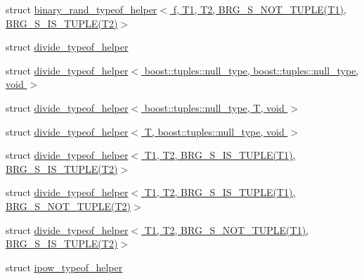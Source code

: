 \begin{DoxyCompactItemize}
struct \hyperlink{structIceBRG_1_1tuples_1_1binary__rand__typeof__helper_3_01f_00_01T1_00_01T2_00_01BRG__S__NOT__Taf66ad01f9236805ac3540fbfcbdbe8d}{binary\+\_\+rand\+\_\+typeof\+\_\+helper$<$ f, T1, T2, B\+R\+G\+\_\+\+S\+\_\+\+N\+O\+T\+\_\+\+T\+U\+P\+L\+E(\+T1), B\+R\+G\+\_\+\+S\+\_\+\+I\+S\+\_\+\+T\+U\+P\+L\+E(\+T2)$>$}
\item 
struct \hyperlink{namespaceIceBRG_1_1tuples_structIceBRG_1_1tuples_1_1divide__typeof__helper}{divide\+\_\+typeof\+\_\+helper}
\item 
struct \hyperlink{namespaceIceBRG_1_1tuples_structIceBRG_1_1tuples_1_1divide__typeof__helper_3_01boost_1_1tuples_1_1null__type_00_01boost_1_bd03af67120e73dd34936ad50f2c1b33}{divide\+\_\+typeof\+\_\+helper$<$ boost\+::tuples\+::null\+\_\+type, boost\+::tuples\+::null\+\_\+type, void $>$}
\item 
struct \hyperlink{namespaceIceBRG_1_1tuples_structIceBRG_1_1tuples_1_1divide__typeof__helper_3_01boost_1_1tuples_1_1null__type_00_01T_00_01void_01_4}{divide\+\_\+typeof\+\_\+helper$<$ boost\+::tuples\+::null\+\_\+type, T, void $>$}
\item 
struct \hyperlink{namespaceIceBRG_1_1tuples_structIceBRG_1_1tuples_1_1divide__typeof__helper_3_01T_00_01boost_1_1tuples_1_1null__type_00_01void_01_4}{divide\+\_\+typeof\+\_\+helper$<$ T, boost\+::tuples\+::null\+\_\+type, void $>$}
\item 
struct \hyperlink{namespaceIceBRG_1_1tuples_structIceBRG_1_1tuples_1_1divide__typeof__helper_3_01T1_00_01T2_00_01BRG__S__IS__TUPLE_07T1_08_00_01BRG__S__IS__TUPLE_07T2_08_4}{divide\+\_\+typeof\+\_\+helper$<$ T1, T2, B\+R\+G\+\_\+\+S\+\_\+\+I\+S\+\_\+\+T\+U\+P\+L\+E(\+T1), B\+R\+G\+\_\+\+S\+\_\+\+I\+S\+\_\+\+T\+U\+P\+L\+E(\+T2)$>$}
\item 
struct \hyperlink{namespaceIceBRG_1_1tuples_structIceBRG_1_1tuples_1_1divide__typeof__helper_3_01T1_00_01T2_00_01BRG__S__IS__TUPLE_07T1_08_086c96d3c3ec89211a6e76f31c5665b8a}{divide\+\_\+typeof\+\_\+helper$<$ T1, T2, B\+R\+G\+\_\+\+S\+\_\+\+I\+S\+\_\+\+T\+U\+P\+L\+E(\+T1), B\+R\+G\+\_\+\+S\+\_\+\+N\+O\+T\+\_\+\+T\+U\+P\+L\+E(\+T2)$>$}
\item 
struct \hyperlink{namespaceIceBRG_1_1tuples_structIceBRG_1_1tuples_1_1divide__typeof__helper_3_01T1_00_01T2_00_01BRG__S__NOT__TUPLE_07T1_08_f2134547733f778a855586b5d8107f2b}{divide\+\_\+typeof\+\_\+helper$<$ T1, T2, B\+R\+G\+\_\+\+S\+\_\+\+N\+O\+T\+\_\+\+T\+U\+P\+L\+E(\+T1), B\+R\+G\+\_\+\+S\+\_\+\+I\+S\+\_\+\+T\+U\+P\+L\+E(\+T2)$>$}
\item 
struct \hyperlink{namespaceIceBRG_1_1tuples_structIceBRG_1_1tuples_1_1ipow__typeof__helper}{ipow\+\_\+typeof\+\_\+helper}

\end{DoxyCompactItemize}
